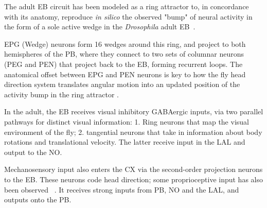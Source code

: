         The adult EB circuit has been modeled as a ring attractor \citep{Stone2017CXModel} to, in concordance with its anatomy, reproduce \textit{in silico} the observed "bump" of neural activity in the form of a sole active wedge in the \textit{Drosophila} adult EB~\citep{seelig2015neural}.

        EPG (Wedge) neurons form 16 wedges around this ring, and project to both hemispheres of the PB, where they connect to two sets of columnar neurons (PEG and PEN) that project back to the EB, forming recurrent loops.
        The anatomical offset between EPG and PEN neurons is key to how the fly head direction system translates angular motion into an updated position of the activity bump in the ring attractor \citep{Stone2017CXModel}.

        In the adult, the EB receives visual inhibitory GABAergic inputs, via two parallel pathways for distinct visual information: 1. Ring neurons that map the visual environment of the fly; 2. tangential neurons that take in information about body rotations and translational velocity. The latter receive input in the LAL and output to the NO.

        Mechanosensory input also enters the CX via the second-order projection neurons to the EB. These neurons code head direction; some proprioceptive input has also been observed ~\citep{hulse2021connectome}. It receives strong inputs from PB, NO and the LAL, and outputs onto the PB.
